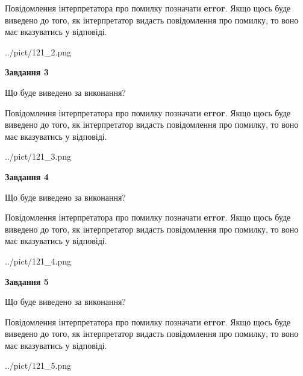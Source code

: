 \documentclass[12pt, ukrainian]{article}
\begin{document}
{\begin {large}
Повідомлення інтерпретатора про помилку позначати \textbf{error}.
Якщо щось буде виведено до того, як інтерпретатор видасть повідомлення про помилку, 
то воно має вказуватись у відповіді. \par


\begin{center}
	{../pict/121_2.png}
\end{center}
\newpage

{\begin {center}\textbf{Завдання 3}\end {center}}\par
Що буде виведено за виконання?

Повідомлення інтерпретатора про помилку позначати \textbf{error}.
Якщо щось буде виведено до того, як інтерпретатор видасть повідомлення про помилку, 
то воно має вказуватись у відповіді. \par


\begin{center}
	{../pict/121_3.png}
\end{center}
\newpage

{\begin {center}\textbf{Завдання 4}\end {center}}\par
Що буде виведено за виконання?

Повідомлення інтерпретатора про помилку позначати \textbf{error}.
Якщо щось буде виведено до того, як інтерпретатор видасть повідомлення про помилку, 
то воно має вказуватись у відповіді. \par


\begin{center}
	{../pict/121_4.png}
\end{center}
\newpage

{\begin {center}\textbf{Завдання 5}\end {center}}\par
Що буде виведено за виконання?

Повідомлення інтерпретатора про помилку позначати \textbf{error}.
Якщо щось буде виведено до того, як інтерпретатор видасть повідомлення про помилку, 
то воно має вказуватись у відповіді. \par


\begin{center}
	{../pict/121_5.png}
\end{center}
\newpage


\end{large}}
\end{document}
